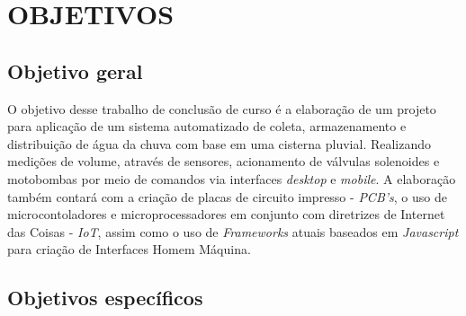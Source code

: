 
\chapter{OBJETIVOS}
\label{chap:objetivos}

\section{Objetivo geral}
\label{sec:objetivogeral}
O objetivo desse trabalho de conclusão de curso é a elaboração de um projeto para aplicação de um sistema automatizado de coleta, armazenamento e distribuição de água da chuva com base em uma cisterna pluvial. Realizando medições de volume, através de sensores, acionamento de válvulas solenoides e motobombas por meio de comandos via interfaces \textit{desktop} e \textit{mobile}. A elaboração também contará com a criação de placas de circuito impresso - \textit{PCB's}, o uso de microcontoladores e microprocessadores em conjunto com  diretrizes de Internet das Coisas - \textit{IoT},  assim como o uso de \textit{Frameworks} atuais baseados em \textit{Javascript} para criação de Interfaces Homem Máquina.

\section{Objetivos específicos}

